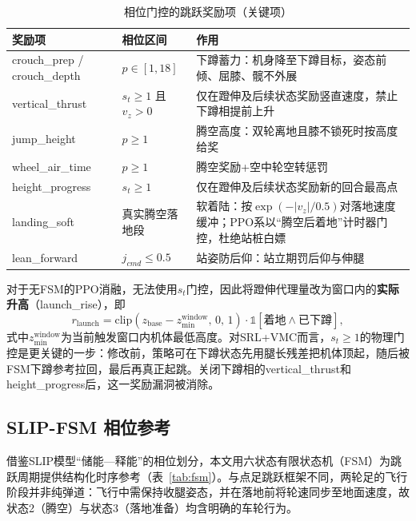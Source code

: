 \documentclass[12pt,a4paper,fontset=fandol]{ctexart}
\numberwithin{equation}{section}
\numberwithin{figure}{section}
\numberwithin{table}{section}
\begin{document}
\begin{table}[htbp]
    \centering
    \caption{相位门控的跳跃奖励项（关键项）}
    \label{tab:phase_reward}
    \begin{tabular}{llp{6.5cm}}
        \toprule
        奖励项 & 相位区间 & 作用 \\
        \midrule
        crouch\_prep / crouch\_depth & $p\in[1,18]$ & 下蹲蓄力：机身降至下蹲目标，姿态前倾、屈膝、髋不外展 \\
        vertical\_thrust & $s_t\ge1$ 且$v_z>0$ & 仅在蹬伸及后续状态奖励竖直速度，禁止下蹲相提前上升 \\
        jump\_height & $p\ge1$ & 腾空高度：双轮离地且膝不锁死时按高度给奖 \\
        wheel\_air\_time & $p\ge1$ & 腾空奖励+空中轮空转惩罚 \\
        height\_progress & $s_t\ge1$ & 仅在蹬伸及后续状态奖励新的回合最高点 \\
        landing\_soft & 真实腾空落地段 & 软着陆：按$\exp(-|v_z|/0.5)$对落地速度缓冲；PPO系以“腾空后着地”计时器门控，杜绝站桩白嫖 \\
        lean\_forward & $j_{cmd}\le0.5$ & 站姿防后仰：站立期罚后仰与伸腿 \\
        \bottomrule
    \end{tabular}
\end{table}

对于无FSM的PPO消融，无法使用$s_t$门控，因此将蹬伸代理量改为窗口内的\textbf{实际升高}（launch\_rise），即
\begin{equation}
r_{\text{launch}} = \text{clip}(z_{\text{base}} - z_{\min}^{\text{window}},\, 0,\, 1) \cdot \mathbb{1}[\text{着地}\wedge\text{已下蹲}],
\label{eq:launch_rise}
\end{equation}
式中$z_{\min}^{\text{window}}$为当前触发窗口内机体最低高度。对SRL+VMC而言，$s_t\ge1$的物理门控是更关键的一步：修改前，策略可在下蹲状态先用腿长残差把机体顶起，随后被FSM下蹲参考拉回，最后再真正起跳。关闭下蹲相的vertical\_thrust和height\_progress后，这一奖励漏洞被消除。

\subsection{SLIP-FSM 相位参考}

借鉴SLIP模型“储能—释能”的相位划分，本文用六状态有限状态机（FSM）为跳跃周期提供结构化时序参考（表~\ref{tab:fsm}）。与点足跳跃框架不同，两轮足的飞行阶段并非纯弹道：飞行中需保持收腿姿态，并在落地前将轮速同步至地面速度，故状态2（腾空）与状态3（落地准备）均含明确的车轮行为。
\end{document}
